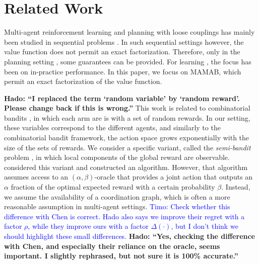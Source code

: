 \documentclass{article}
\def\hado#1{\textcolor{RubineRed}{\textbf{Hado: ``#1''}}}
\begin{document}
\section{Related Work}

Multi-agent reinforcement learning and planning with loose couplings has mainly been studied in sequential problems \cite{Guestrin02,KokVlassis06,scharpff16solving}.  In such sequential settings however, the value function does not permit an exact factorization. Therefore, only in the planning setting \cite{scharpff16solving}, some guarantees can be provided. For learning \cite{KokVlassis06}, the focus has been on in-practice performance. In this paper, we focus on MAMAB, which permit an exact factorization of the value function. 

\hado{I replaced the term `random variable' by `random reward'.  Please change back if this is wrong.}
This work is related to combinatorial bandits \citep{bubeck2012regret, cesa2012combinatorial, gai2012combinatorial, chen2013combinatorial}, in which each arm are is with a set of random rewards. In our setting, these variables correspond to the different agents, and similarly to the combinatorial bandit framework, the action space grows exponentially with the size of the sets of rewards.
We consider a specific variant, called the \emph{semi-bandit} problem \cite{audibert2011minimax}, in which local components of the global reward are observable. \citet{chen2013combinatorial} considered this variant and constructed an algorithm.  However, that algorithm assumes access to an $(\alpha, \beta)$-oracle that provides a joint action that outputs an $\alpha$ fraction of the optimal expected reward with a certain probability $\beta$.  Instead, we assume the availability of a coordination graph, which is often a more reasonable assumption in multi-agent settings. \textcolor{blue}{Timo: Check whether this difference with Chen is correct. Hado also says we improve their regret with a factor $\rho$, while they improve ours with a factor $\Delta(\cdot)$, but I don't think we should highlight these small differences.}
\hado{Yes, checking the difference with Chen, and especially their reliance on the oracle, seems important.  I slightly rephrased, but not sure it is 100\% accurate.}
\end{document}
